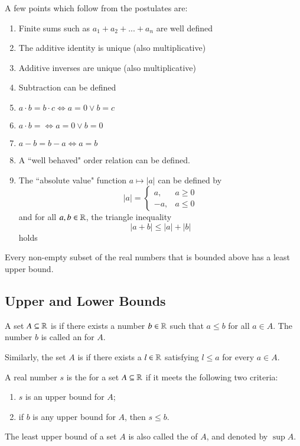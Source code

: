 \begin{rmk}
    A few points which follow from the postulates are:\begin{enumerate}
        \item Finite sums such as $a_1+a_2+...+a_n$ are well defined
        \item The additive identity is unique (also multiplicative)
        \item Additive inverses are unique (also multiplicative)
        \item Subtraction can be defined 
        \item $a \cdot b = b \cdot c \iff a = 0\lor b = c$
        \item $a\cdot b = \iff a = 0 \lor b = 0$
        \item $a-b = b-a \iff a = b$
        \item A ``well behaved" order relation can be defined.
        \item The ``absolute value" function $a \mapsto |a|$ can be defined by $$|a| = \left\{\begin{array}{ll} a, & a \geq 0 \\ -a, & a \leq 0 \end{array}\right.$$ and for all $a,b \in \mathbb R$, the triangle inequality $$|a+b| \leq |a| + |b|$$ holds
    \end{enumerate}
\end{rmk}


\begin{axi}
    Every non-empty subset of the real numbers that is bounded above has a least upper bound.
\end{axi}

\subsection{Upper and Lower Bounds}

\begin{defn}[Bounds]
    A set $A \subseteq \mathbb R$ is  if there exists a number $b \in \mathbb R$ such that $a \leq b$ for all $a \in A$. The number $b$ is called an  for $A$.


    Similarly, the set $A$ is  if there exists a  $l \in \mathbb R$ satisfying $l \leq a$ for every $a \in A$.
\end{defn}

\begin{defn}
    A real number $s$ is the  for a set $A \subseteq \mathbb R$ if it meets the following two criteria: \begin{enumerate}
        \item $s$ is an upper bound for $A$;
        \item if $b$ is any upper bound for $A$, then $s \leq b$.
    \end{enumerate}
    The least upper bound of a set $A$ is also called the  of $A$, and denoted by $\sup A$.
\end{defn}

